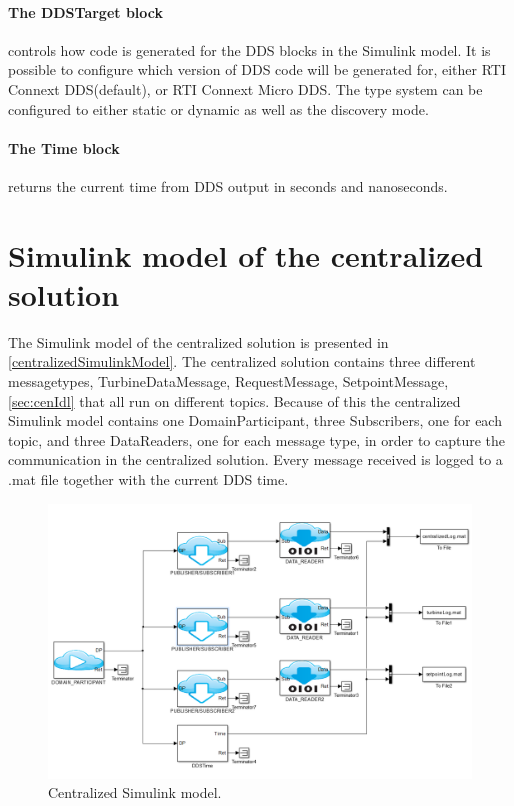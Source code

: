 \paragraph{The DDSTarget block} controls how code is generated for the DDS blocks in the Simulink model. It is possible to configure which version of DDS code will be generated for, either RTI Connext DDS(default), or RTI Connext Micro DDS. The type system can be configured to either static or dynamic as well as the discovery mode.

\paragraph{The Time block} returns the current time from DDS output in seconds and nanoseconds.

\section{Simulink model of the centralized solution}\label{subsec:centralizedmodel}
The Simulink model of the centralized solution is presented in \cref{centralizedSimulinkModel}. The centralized solution contains three different messagetypes, TurbineDataMessage, RequestMessage, SetpointMessage, \cref{sec:cenIdl} that all run on different topics. Because of this the centralized Simulink model contains one DomainParticipant, three Subscribers, one for each topic, and three DataReaders, one for each message type, in order to capture the communication in the centralized solution. Every message received is logged to a .mat file together with the current DDS time.

\begin{figure}[!h]
	\includegraphics[width=\textwidth]{figures/CentralizedModel}
	\caption[Centralized Simulink model]{
		\label{fig:centralizedSimulinkModel} 
		\footnotesize{%
			Centralized Simulink model.
		}
	}
\end{figure}

